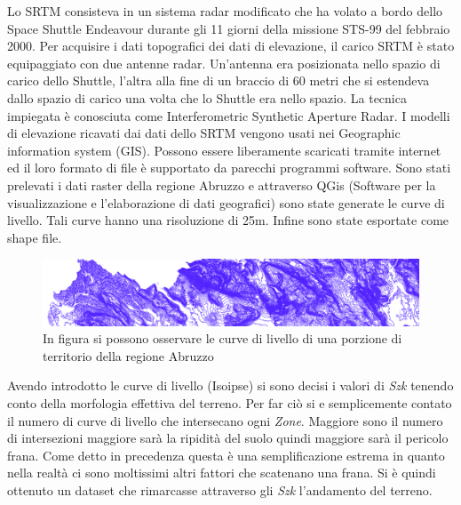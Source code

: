 Lo SRTM consisteva in un sistema radar modificato che ha volato a bordo dello Space Shuttle Endeavour durante gli 11 giorni della missione STS-99 del febbraio 2000. Per acquisire i dati topografici dei dati di elevazione, il carico SRTM è stato equipaggiato con due antenne radar. Un'antenna era posizionata nello spazio di carico dello Shuttle, l'altra alla fine di un braccio di 60 metri che si estendeva dallo spazio di carico una volta che lo Shuttle era nello spazio. La tecnica impiegata è conosciuta come Interferometric Synthetic Aperture Radar. I modelli di elevazione ricavati dai dati dello SRTM vengono usati nei Geographic information system (GIS). Possono essere liberamente scaricati tramite internet ed il loro formato di file è supportato da parecchi programmi software. Sono stati prelevati i dati raster della regione Abruzzo e attraverso QGis (Software per la visualizzazione e l'elaborazione di dati geografici) sono state generate le curve di livello. Tali curve hanno una risoluzione di 25m. Infine sono state esportate come shape file.
\begin{figure}[h]
	\centering
	\includegraphics[width=1\textwidth]{images/dettaglioCurve.PNG}
	\caption{In figura si possono osservare le curve di livello di una porzione di territorio della regione Abruzzo}
	\label{fig:diagrammaER}
\end{figure}
Avendo introdotto le curve di livello (Isoipse) si sono decisi i valori di \textit{Szk} tenendo conto della morfologia effettiva del terreno. 
Per far ciò si e semplicemente contato il numero di curve di livello che intersecano ogni \textit{Zone}. Maggiore sono il numero di intersezioni maggiore sarà la ripidità del suolo quindi maggiore sarà il pericolo frana. Come detto in precedenza questa è una semplificazione estrema in quanto nella realtà ci sono moltissimi altri fattori che scatenano una frana. Si è quindi ottenuto un dataset che rimarcasse attraverso gli \textit{Szk} l'andamento del terreno.
